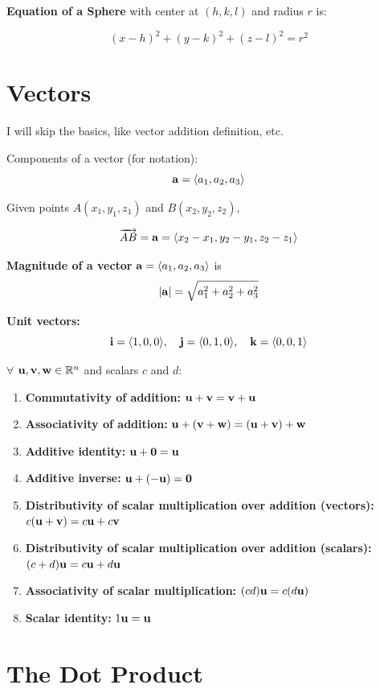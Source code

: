 \documentclass{report}
\begin{document}
\textbf{Equation of a Sphere} with center at $(h, k, l)$ and radius $r$ is:

\[(x - h)^2 + (y - k)^2 + (z - l)^2 = r^2\]

\section{Vectors}

I will skip the basics, like vector addition definition, etc.

Components of a vector (for notation):
\[\mathbf{a} = \langle a_1, a_2, a_3 \rangle\]

Given points $A(x_1, y_1, z_1)$ and $B(x_2, y_2, z_2)$, 

\[\overrightarrow{AB} = \mathbf{a} = \langle x_2 - x_1, y_2 - y_1, z_2 - z_1 \rangle\]

\textbf{Magnitude of a vector} $\mathbf{a} = \langle a_1, a_2, a_3 \rangle$ is 
\[|\mathbf{a}| = \sqrt{a_1^2 + a_2^2 + a_3^2}\]

\textbf{Unit vectors:} 
\[\mathbf{i} = \langle 1, 0, 0 \rangle, \quad \mathbf{j} = \langle 0, 1, 0 \rangle, \quad \mathbf{k} = \langle 0, 0, 1 \rangle\]


\begin{tcolorbox}[colback=blue!5!white, colframe=blue!75!black, title=Algebraic Properties of Vectors in $\Rn$]
$\forall$ $\mathbf{u}, \mathbf{v}, \mathbf{w} \in \mathbb{R}^n$ and scalars $c$ and $d$:
\begin{enumerate}
    \item \textbf{Commutativity of addition:} $\mathbf{u} + \mathbf{v} = \mathbf{v} + \mathbf{u}$
    \item \textbf{Associativity of addition:} $\mathbf{u} + (\mathbf{v} + \mathbf{w}) = (\mathbf{u} + \mathbf{v}) + \mathbf{w}$
    \item \textbf{Additive identity:} $\mathbf{u} + \mathbf{0} = \mathbf{u}$
    \item \textbf{Additive inverse:} $\mathbf{u} + (-\mathbf{u}) = \mathbf{0}$
    \item \textbf{Distributivity of scalar multiplication over addition (vectors):} $c(\mathbf{u} + \mathbf{v}) = c\mathbf{u} + c\mathbf{v}$
    \item \textbf{Distributivity of scalar multiplication over addition (scalars):} $(c + d)\mathbf{u} = c\mathbf{u} + d\mathbf{u}$
    \item \textbf{Associativity of scalar multiplication:} $(cd)\mathbf{u} = c(d\mathbf{u})$
    \item \textbf{Scalar identity:} $1 \mathbf{u} = \mathbf{u}$
\end{enumerate}
\end{tcolorbox}

\section{The Dot Product}
\end{document}
